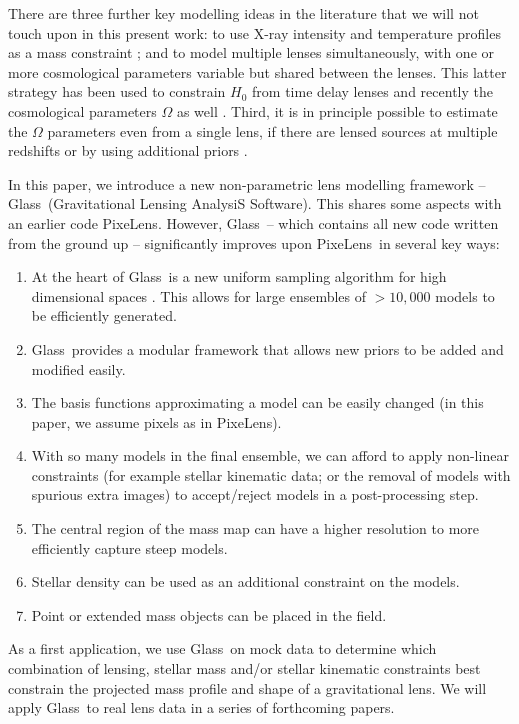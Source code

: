 \documentclass[galley,usenatbib]{mn2e}
\newcommand{\Glass}{{\sc Glass}}
\newcommand{\PixeLens}{{\sc PixeLens}}
\begin{document}
There are three further key modelling ideas in the literature that we will not
touch upon in this present work: to use X-ray intensity and temperature
profiles as a mass constraint \citep[e.g.][]{2013ApJ...765...25N}; and to model
multiple lenses simultaneously, with one or more cosmological parameters
variable but shared between the lenses. This latter strategy has been used to
constrain $H_0$ from time delay lenses
\citep{2006ApJ...652L...5S,2008ApJ...679...17C,2010ApJ...712.1378P} and
recently the cosmological parameters $\Omega$ as well
\citep{2014MNRAS.437..600S}.  Third, it is in principle possible to estimate
the $\Omega$ parameters even from a single lens, if there are lensed sources at
multiple redshifts \citep{2014MNRAS.437.2461L} or by using additional priors 
\citep{2010Sci...329..924J,2013arXiv1306.4732S}.

In this paper, we introduce a new non-parametric lens modelling framework  -- \Glass\ (Gravitational
Lensing AnalysiS Software). This shares some aspects with an earlier code \PixeLens \citep{Saha2004,2008ApJ...679...17C}. However, \Glass\ -- which contains all new code written from the ground up -- significantly improves upon \PixeLens\ in several key ways: 

\begin{enumerate}
\item At the heart of \Glass\ is a new uniform sampling algorithm for high dimensional spaces \citep{2012MNRAS.425.3077L}. This allows for large ensembles of $>10,000$ models to be efficiently generated. 
\item \Glass\ provides a modular framework that allows new priors to be added and modified easily.
\item The basis functions approximating a model can be easily changed (in this paper, we assume pixels as in \PixeLens). 
\item With so many models in the final ensemble, we can afford to apply non-linear constraints (for example stellar kinematic data; or the removal of models with spurious extra images) to accept/reject models in a post-processing step.
\item The central region of the mass map can have a higher resolution to more efficiently capture steep models.
\item Stellar density can be used as an additional constraint on the models. 
\item Point or extended mass objects can be placed in the field.
\end{enumerate}
As a first application, we use \Glass\ on mock data to determine which combination of lensing, stellar mass and/or 
stellar kinematic constraints best constrain the projected mass profile and
shape of a gravitational lens. We will apply \Glass\ to real lens data in a series of forthcoming papers. 
\end{document}
